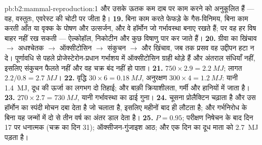 \begin{solution}{pb:b2:mammal-reproduction:1}
और उसके ऊतक कम दाब पर काम करने को अनुकूलित हैं --- वह, वस्तुतः,
एवरेस्ट की चोटी पर जीता है।
\textbf{19.} बिना काम करते फेफड़े के गैस-विनिमय, बिना काम करती आँत या
वृक्क के पोषण और उत्सर्जन, और वे हॉर्मोन जो
गर्भावस्था बनाए रखते हैं; पर वह हर विष बाहर नहीं रख सकती --- ऐल्कोहॉल,
निकोटीन और कुछ विषाणु पार कर जाते हैं।
\textbf{20.} ग्रीवा का खिंचाव $\to$ अधश्चेतक $\to$ ऑक्सीटोसिन $\to$
संकुचन $\to$ और खिंचाव, जब तक प्रसव वह उद्दीपन हटा न दे।
पूर्णावधि से पहले प्रोजेस्टेरोन-प्रधान गर्भाशय में ऑक्सीटोसिन
ग्राही थोड़े हैं और अंतराल संधियाँ नहीं, इसलिए संकुचन फैलते नहीं और वह
चक्र बंद नहीं हो पाता।
\textbf{21.} $750\times 2.9 = \qty{2.2}{MJ}$; लागत $2.2/0.8 =
\qty{2.7}{MJ}$।
\textbf{22.} वृद्धि $30\times 6 = \qty{0.18}{MJ}$, अनुरक्षण
$300\times 4 = \qty{1.2}{MJ}$: यानी \qty{1.4}{MJ}, दूध की ऊर्जा का
लगभग दो तिहाई; और बाक़ी क्रियाशीलता, गर्मी और हानियों में जाता है।
\textbf{23.} $270\times 2.7 = \qty{730}{MJ}$, यानी गर्भावस्था का
ढाई गुना।
\textbf{24.} चूसना प्रोलैक्टिन चढ़ाता है और उस हॉर्मोन का स्पंदी
मोचन दबा देता है जो  चलाता है, इसलिए 
महीनों बाद ही लौटता है; और गर्भनिरोध के बिना यह जन्मों में दो
से तीन वर्ष का अंतर डाल देता है।
\textbf{25.} $P = 0.95$; परीक्षण निषेचन के बाद दिन 17 पर धनात्मक
(चक्र का दिन 31); ऑक्सीजन-गुंजाइश आठ; और एक दिन का दूध माता को
\qty{2.7}{MJ} पड़ता है।
\end{solution}
